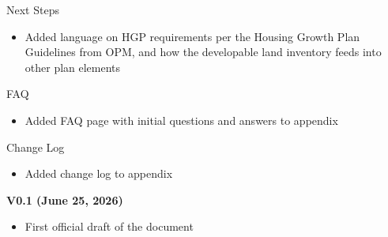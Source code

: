 \documentclass[
  letterpaper,
  DIV=11,
  numbers=noendperiod]{scrreprt}
\providecommand{\tightlist}{%
  \setlength{\itemsep}{0pt}\setlength{\parskip}{0pt}}
\begin{document}
Next Steps

\begin{itemize}
\tightlist
\item
  Added language on HGP requirements per the Housing Growth Plan
  Guidelines from OPM, and how the developable land inventory feeds into
  other plan elements
\end{itemize}

FAQ

\begin{itemize}
\tightlist
\item
  Added FAQ page with initial questions and answers to appendix
\end{itemize}

Change Log

\begin{itemize}
\tightlist
\item
  Added change log to appendix
\end{itemize}

\textbf{V0.1 (June 25, 2026)}

\begin{itemize}
\tightlist
\item
  First official draft of the document
\end{itemize}
\end{document}
